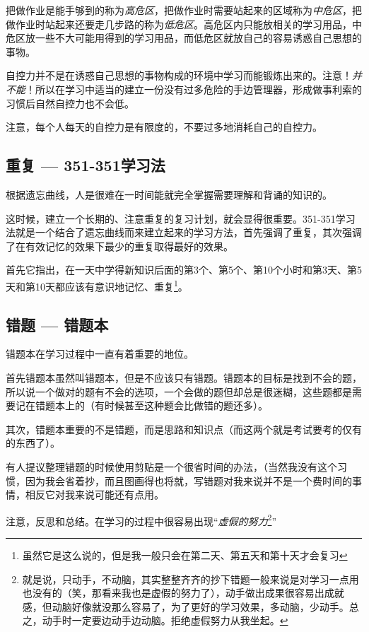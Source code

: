 \documentclass[b5paper]{ctexart}
\begin{document}
			把做作业是能手够到的称为\emph{高危区}，把做作业时需要站起来的区域称为\emph{中危区}，把做作业时站起来还要走几步路的称为\emph{低危区}。高危区内只能放相关的学习用品，中危区放一些不大可能用得到的学习用品，而低危区就放自己的容易诱惑自己思想的事物。

			自控力并不是在诱惑自己思想的事物构成的环境中学习而能锻炼出来的。注意！\emph{并不能}！所以在学习中适当的建立一份没有过多危险的手边管理器，形成做事利索的习惯后自然自控力也不会低。

			注意，每个人每天的自控力是有限度的，不要过多地消耗自己的自控力。

		\subsection{重复 --- 351-351学习法}
			根据遗忘曲线，人是很难在一时间能就完全掌握需要理解和背诵的知识的。

			这时候，建立一个长期的、注意重复的复习计划，就会显得很重要。351-351学习法就是一个结合了遗忘曲线而来建立起来的学习方法，首先强调了重复，其次强调了在有效记忆的效果下最少的重复取得最好的效果。

			首先它指出，在一天中学得新知识后面的第3个、第5个、第10个小时和第3天、第5天和第10天都应该有意识地记忆、重复\footnote{虽然它是这么说的，但是我一般只会在第二天、第五天和第十天才会复习}。

		\subsection{错题 --- 错题本}
			错题本在学习过程中一直有着重要的地位。

			首先错题本虽然叫错题本，但是不应该只有错题。错题本的目标是找到不会的题，所以说一个做对的题有不会的选项，一个会做的题但却总是很迷糊，这些题都是需要记在错题本上的（有时候甚至这种题会比做错的题还多）。

			其次，错题本重要的不是错题，而是思路和知识点（而这两个就是考试要考的仅有的东西了）。

			有人提议整理错题的时候使用剪贴是一个很省时间的办法，（当然我没有这个习惯，因为我会省着抄，而且图画得也将就，写错题对我来说并不是一个费时间的事情，相反它对我来说可能还有点用。

			注意，反思和总结。在学习的过程中很容易出现``\emph{虚假的努力}\footnote{就是说，只动手，不动脑，其实整整齐齐的抄下错题一般来说是对学习一点用也没有的（笑，那看来我也是虚假的努力了），动手做出成果很容易出成就感，但动脑好像就没那么容易了，为了更好的学习效果，多动脑，少动手。总之，动手时一定要边动手边动脑。拒绝虚假努力从我坐起。}''
\end{document}
